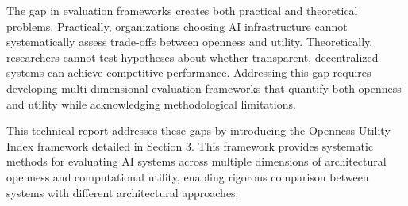 The gap in evaluation frameworks creates both practical and theoretical problems. Practically, organizations choosing AI infrastructure cannot systematically assess trade-offs between openness and utility. Theoretically, researchers cannot test hypotheses about whether transparent, decentralized systems can achieve competitive performance. Addressing this gap requires developing multi-dimensional evaluation frameworks that quantify both openness and utility while acknowledging methodological limitations.

This technical report addresses these gaps by introducing the Openness-Utility Index framework detailed in Section 3. This framework provides systematic methods for evaluating AI systems across multiple dimensions of architectural openness and computational utility, enabling rigorous comparison between systems with different architectural approaches.
